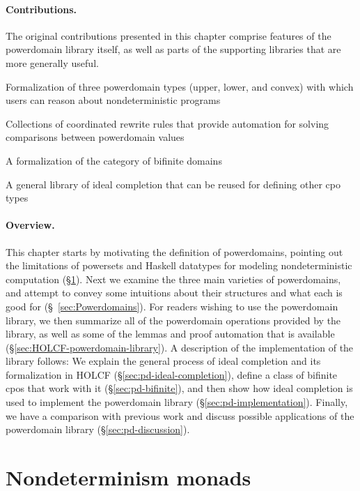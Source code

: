 \paragraph{Contributions.} The original contributions presented in this chapter comprise features of the powerdomain library itself, as well as parts of the supporting libraries that are more generally useful.
\begin{itemize*}
\item Formalization of three powerdomain types (upper, lower, and convex) with which users can reason about nondeterministic programs
\item Collections of coordinated rewrite rules that provide automation for solving comparisons between powerdomain values
\item A formalization of the category of bifinite domains
\item A general library of ideal completion that can be reused for defining other cpo types
\end{itemize*}

\paragraph{Overview.} This chapter starts by motivating the definition of powerdomains, pointing out the limitations of powersets and Haskell datatypes for modeling nondeterministic computation (\S\ref{sec:Nondeterminism-Monads}). Next we examine the three main varieties of powerdomains, and attempt to convey some intuitions about their structures and what each is good for (\S~\ref{sec:Powerdomains}). For readers wishing to use the  powerdomain library, we then summarize all of the powerdomain operations provided by the library, as well as some of the lemmas and proof automation that is available (\S\ref{sec:HOLCF-powerdomain-library}). A description of the implementation of the library follows: We explain the general process of ideal completion and its formalization in HOLCF (\S\ref{sec:pd-ideal-completion}), define a class of bifinite cpos that work with it (\S\ref{sec:pd-bifinite}), and then show how ideal completion is used to implement the powerdomain library (\S\ref{sec:pd-implementation}). Finally, we have a comparison with previous work and discuss possible applications of the powerdomain library (\S\ref{sec:pd-discussion}).

\section{Nondeterminism monads}
\label{sec:Nondeterminism-Monads}

